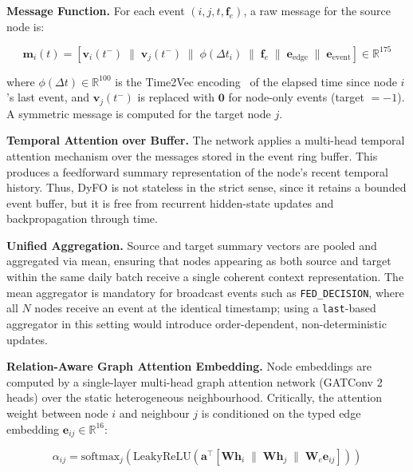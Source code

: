 \documentclass[runningheads]{llncs}
\begin{document}
\textbf{Message Function.} For each event $(i, j, t, \mathbf{f}_e)$, a raw message for the source node is:

\begin{equation}\mathbf{m}_i(t) = \left[\mathbf{v}_i(t^-) \;\|\; \mathbf{v}_j(t^-) \;\|\;
\phi(\Delta t_i) \;\|\; \mathbf{f}_e \;\|\; \mathbf{e}_{\text{edge}} \;\|\;
\mathbf{e}_{\text{event}}\right] \in \mathbb{R}^{175}
\end{equation}

where $\phi(\Delta t) \in \mathbb{R}^{100}$ is the Time2Vec encoding~\cite{kazemi2019time2vec} of the elapsed time since node $i$'s last event, and $\mathbf{v}_j(t^-)$ is replaced with $\mathbf{0}$ for node-only events (target $= -1$). A symmetric message is computed for the target node $j$.

\textbf{Temporal Attention over Buffer.} The network applies a multi-head temporal attention mechanism over the messages stored in the event ring buffer. This produces a feedforward summary representation of the node’s recent temporal history. Thus, DyFO is not stateless in the strict sense, since it retains a bounded event buffer, but it is free from recurrent hidden-state updates and backpropagation through time.

\textbf{Unified Aggregation.} Source and target summary vectors are pooled and aggregated via mean, ensuring that nodes appearing as both source and target within the same daily batch receive a single coherent context representation. The mean aggregator is mandatory for broadcast events such as
\texttt{FED\_DECISION}, where all $N$ nodes receive an event at the identical timestamp; using a \texttt{last}-based aggregator in this setting would introduce order-dependent, non-deterministic updates.

\textbf{Relation-Aware Graph Attention Embedding.}
Node embeddings are computed by a single-layer multi-head graph attention network (GATConv 2 heads) over the static heterogeneous neighbourhood. Critically, the attention weight between node $i$ and neighbour $j$ is
conditioned on the typed edge embedding $\mathbf{e}_{ij} \in \mathbb{R}^{16}$:

\begin{equation}
\alpha_{ij} = \mathrm{softmax}_j \!\left(
    \mathrm{LeakyReLU}\!\left(
        \mathbf{a}^{\top}
        \left[
            \mathbf{W}\mathbf{h}_i \;\|\;
            \mathbf{W}\mathbf{h}_j \;\|\;
            \mathbf{W}_e \mathbf{e}_{ij}
        \right]
    \right)
\right)
\label{eq:relation_aware_attn}
\end{equation}
\end{document}
